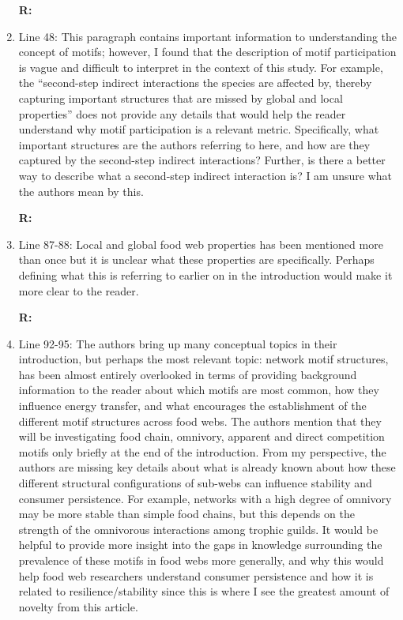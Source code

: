\documentclass[12pt]{article}
\begin{document}
\begin{enumerate}
                \textbf{R:}


            \item Line 48: This paragraph contains important information to understanding the concept of motifs; however, I found that the description of motif participation is vague and difficult to interpret in the context of this study. For example, the “second-step indirect interactions the species are affected by, thereby capturing important structures that are missed by global and local properties” does not provide any details that would help the reader understand why motif participation is a relevant metric. Specifically, what important structures are the authors referring to here, and how are they captured by the second-step indirect interactions? Further, is there a better way to describe what a second-step indirect interaction is? I am unsure what the authors mean by this.

                \textbf{R:}

            
            \item Line 87-88: Local and global food web properties has been mentioned more than once but it is unclear what these properties are specifically. Perhaps defining what this is referring to earlier on in the introduction would make it more clear to the reader.

                \textbf{R:}

            
            \item Line 92-95: The authors bring up many conceptual topics in their introduction, but perhaps the most relevant topic: network motif structures, has been almost entirely overlooked in terms of providing background information to the reader about which motifs are most common, how they influence energy transfer, and what encourages the establishment of the different motif structures across food webs. The authors mention that they will be investigating food chain, omnivory, apparent and direct competition motifs only briefly at the end of the introduction. From my perspective, the authors are missing key details about what is already known about how these different structural configurations of sub-webs can influence stability and consumer persistence. For example, networks with a high degree of omnivory may be more stable than simple food chains, but this depends on the strength of the omnivorous interactions among trophic guilds. It would be helpful to provide more insight into the gaps in knowledge surrounding the prevalence of these motifs in food webs more generally, and why this would help food web researchers understand consumer persistence and how it is related to resilience/stability since this is where I see the greatest amount of novelty from this article.


\end{enumerate}
\end{document}
